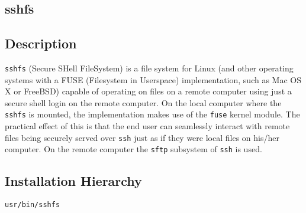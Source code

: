 \documentclass[a4paper]{report}
\begin{document}
\begin{enumerate}


\chapter{sshfs}
\section{Description}
{\tt sshfs} (Secure SHell FileSystem) is a file system for Linux 
(and other operating systems with a FUSE (Filesystem in Userspace) 
implementation, such as Mac OS X or FreeBSD) capable of operating on 
files on a remote computer using just a secure shell login on the remote 
computer. On the local computer where the {\tt sshfs} is mounted, the 
implementation makes use of the {\tt fuse}  kernel module. The practical 
effect of this is that the end user can seamlessly interact with remote 
files being securely served over {\tt ssh} just as if they were local files 
on his/her computer. On the remote computer the {\tt sftp} subsystem of 
{\tt ssh} is used.
\section{Installation Hierarchy}
\begin{lstlisting}
usr/bin/sshfs
\end{lstlisting}

\end{enumerate}
\end{document}
